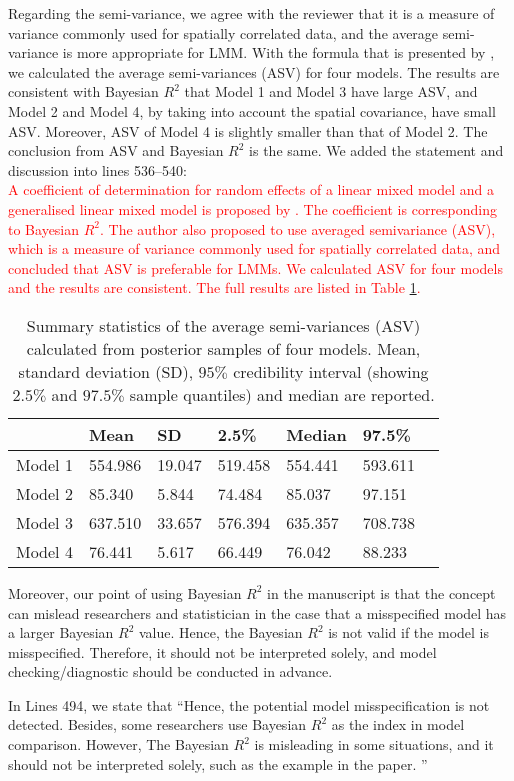 \documentclass[a4paper]{article}   	%
\begin{document}
\begin{enumerate}
    Regarding the semi-variance, we agree with the reviewer that it is a measure of variance commonly used for spatially correlated data, and the average semi-variance is more appropriate for LMM. With the formula that is presented by \textcite{Piepho2019Coefficient}, we calculated the average semi-variances (ASV) for four models. The results are consistent with Bayesian $R^2$ that Model 1 and Model 3 have large ASV, and Model 2 and Model 4, by taking into account the spatial covariance, have small ASV. Moreover, ASV of Model 4 is slightly smaller than that of Model 2. The conclusion from ASV and Bayesian $R^2$ is the same. We added the statement and discussion into lines 536--540:\\
    \textcolor{red}{A coefficient of determination for random effects of a linear mixed model and a generalised linear mixed model is proposed by \textcite{Piepho2019Coefficient}. The coefficient is corresponding to Bayesian $R^2$. The author also proposed to use averaged semivariance (ASV), which is a measure of variance commonly used for spatially correlated data, and concluded that ASV is preferable for LMMs. We calculated ASV for four models and the results are consistent. The full results are listed in Table \ref{tb:asv}. }
    
    \begin{table}[!htp]
    \centering
    \begin{tabular}{lllllll}
    \toprule
            & Mean     & SD     & 2.5\%   & Median  & 97.5\% \\ \midrule
    Model 1 & 554.986  & 19.047 &519.458  & 554.441 & 593.611   \\
    Model 2 & 85.340   & 5.844  & 74.484  & 85.037  & 97.151     \\
    Model 3 & 637.510  & 33.657 & 576.394 & 635.357 & 708.738  \\
    Model 4 & 76.441   & 5.617  & 66.449  & 76.042  & 88.233\\
    \bottomrule
    \end{tabular}\caption{Summary statistics of the average semi-variances (ASV) calculated from posterior samples of four models. Mean, standard deviation (SD), $95\%$ credibility interval (showing $2.5\%$ and $97.5\%$ sample quantiles) and median are reported.}\label{tb:asv}
    \end{table}
    
    Moreover, our point of using Bayesian $R^2$ in the manuscript is that the concept can mislead researchers and statistician in the case that a misspecified model has a larger Bayesian $R^2$ value. Hence, the Bayesian $R^2$ is not valid if the model is misspecified. Therefore, it should not be interpreted solely, and model checking/diagnostic should be conducted in advance. 
    
    In Lines 494, we state that ``Hence, the potential model misspecification is not detected. Besides, some researchers use Bayesian $R^2$ as the index in model comparison. However, The Bayesian $R^2$ is misleading in some  situations, and it should not be interpreted solely, such as the example in the paper. ''
    
\end{enumerate}




\renewcommand\bibname{References}%
\printbibliography
\end{document}
